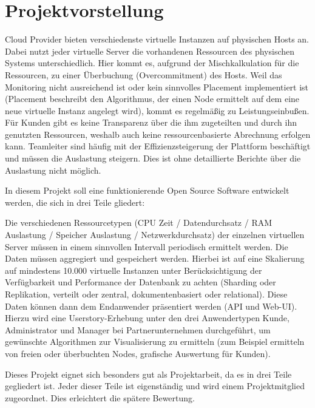 \chapter{Projektvorstellung}
\label{subsec:projektvorstellung}
Cloud Provider bieten verschiedenste virtuelle Instanzen auf physischen Hosts
an. Dabei nutzt jeder virtuelle Server die vorhandenen Ressourcen des
physischen Systems unterschiedlich. Hier kommt es, aufgrund der
Mischkalkulation für die Ressourcen, zu einer Überbuchung (Overcommitment) des
Hosts. Weil das Monitoring nicht ausreichend ist oder kein sinnvolles Placement
implementiert ist (Placement beschreibt den Algorithmus, der einen Node
ermittelt auf dem eine neue virtuelle Instanz angelegt wird), kommt es
regelmäßig zu Leistungseinbußen. Für Kunden gibt es keine Transparenz über die
ihm zugeteilten und durch ihn genutzten Ressourcen, weshalb auch keine
ressourcenbasierte Abrechnung erfolgen kann. Teamleiter sind häufig mit der
Effizienzsteigerung der Plattform beschäftigt und müssen die Auslastung
steigern. Dies ist ohne detaillierte Berichte über die Auslastung nicht
möglich.

In diesem Projekt soll eine funktionierende Open Source Software entwickelt
werden, die sich in drei Teile gliedert:

\begin{outline}
  \1 Die verschiedenen Ressourcetypen (CPU Zeit / Datendurchsatz / RAM
  Auslastung / Speicher Auslastung / Netzwerkdurchsatz) der einzelnen
  virtuellen Server müssen in einem sinnvollen Intervall periodisch ermittelt
  werden.
  \1 Die Daten müssen aggregiert und gespeichert werden. Hierbei ist auf eine
  Skalierung auf mindestens 10.000 virtuelle Instanzen unter Berücksichtigung
  der Verfügbarkeit und Performance der Datenbank zu achten (Sharding oder
  Replikation, verteilt oder zentral, dokumentenbasiert oder relational).
  \1 Diese Daten können dann dem Endanwender präsentiert werden (\gls{API} und
  Web-UI). Hierzu wird eine Userstory-Erhebung unter den drei Anwendertypen
  Kunde, Administrator und Manager bei Partnerunternehmen durchgeführt, um
  gewünschte Algorithmen zur Visualisierung zu ermitteln (zum Beispiel
  ermitteln von freien oder überbuchten Nodes, grafische Auswertung für Kunden).
\end{outline}

Dieses Projekt eignet sich besonders gut als Projektarbeit, da es in drei Teile
gegliedert ist. Jeder dieser Teile ist eigenständig und wird einem
Projektmitglied zugeordnet. Dies erleichtert die spätere Bewertung.
\all%

